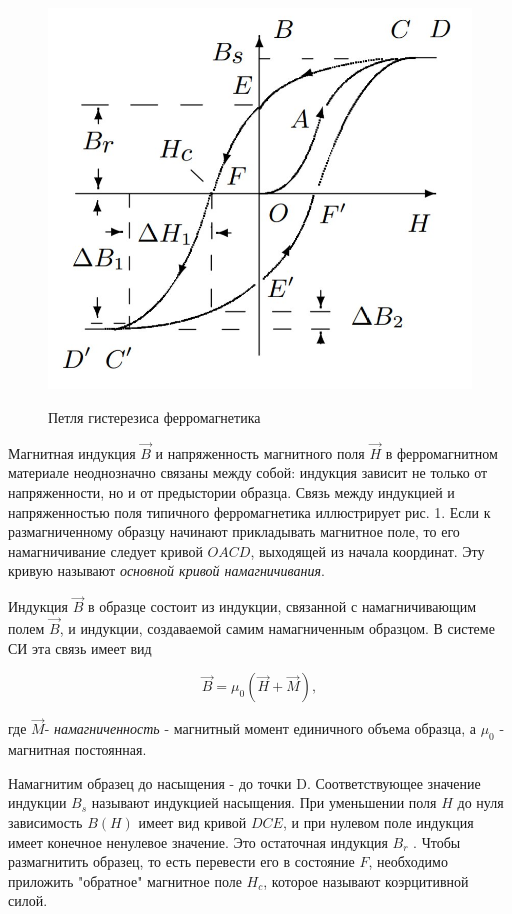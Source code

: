 \documentclass[12pt]{kiarticle}
\begin{document}
	\begin{figure}
		\vspace{-20pt}
		\begin{center}
			\includegraphics[width=0.7\linewidth]{gist3.jpg}
			\label{fig:sdfsafd}
		\end{center}
		\vspace{-10pt}
		\caption{Петля гистерезиса ферромагнетика}
	\end{figure}

	Магнитная индукция $\vec{B}$ и напряженность магнитного поля
	$\vec{H}$ в ферромагнитном материале неоднозначно связаны
	между собой: индукция зависит не только от напряженности, но
	и от предыстории образца. Связь между индукцией
	и напряженностью поля типичного ферромагнетика иллюстрирует рис. 1. Если
	к размагниченному образцу начинают прикладывать магнитное поле, то его намагничивание следует кривой $ OACD $, выходящей
	из начала
	координат. Эту кривую называют \textit{основной кривой намагничивания}.
	
	
	Индукция $\vec{B}$ в образце состоит из индукции, связанной с намагничивающим полем
	$\vec{B}$, и индукции, создаваемой самим намагниченным
	образцом.
	В системе СИ эта связь имеет вид
	
	$$\vec{B} = \mu_{0}(\vec{H}+\vec{M}),$$
	
	где $\vec{M}$- \textit{намагниченность} - магнитный момент единичного объема образца, а $\mu_{0}$ - магнитная постоянная.
	
	Намагнитим образец до насыщения - до точки D. Соответствующее
	значение индукции $B_{s}$ называют индукцией насыщения. При уменьшении поля $H$ до нуля зависимость $B(H)$ имеет вид кривой $DCE$, и при нулевом поле индукция имеет конечное ненулевое значение. Это остаточная индукция $B_{r}$ . Чтобы размагнитить образец, то есть перевести его в состояние
	$F$, необходимо приложить "обратное" магнитное
	поле $H_{c}$, которое называют коэрцитивной силой.
	
\end{document}
